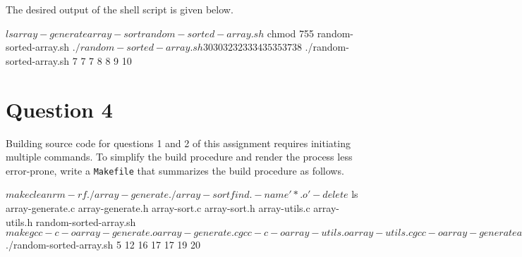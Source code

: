 \documentclass[12pt,letterpaper,twoside]{article}
\begin{document}
The desired output of the shell script is given below.

\begin{terminal}
$ ls
array-generate array-sort random-sorted-array.sh
$ chmod 755 random-sorted-array.sh
$ ./random-sorted-array.sh
30 30 32 32 33 34 35 35 37 38
$ ./random-sorted-array.sh
7 7 7 8 8 9 10
\end{terminal}

\section*{Question 4}

Building source code for questions 1 and 2 of this assignment requires initiating multiple commands.
To simplify the build procedure and render the process less error-prone, write a \texttt{Makefile} that summarizes the build procedure as follows.

\begin{terminal}
$ make clean
rm -rf ./array-generate ./array-sort
find . -name '*.o' -delete
$ ls
array-generate.c array-generate.h array-sort.c array-sort.h
array-utils.c array-utils.h random-sorted-array.sh
$ make
gcc -c -o array-generate.o array-generate.c
gcc -c -o array-utils.o array-utils.c
gcc -o array-generate array-generate.o array-utils.o -Werror -Wall -std=gnu99 -I.
gcc -c -o array-sort.o array-sort.c
gcc -o array-sort array-sort.o array-utils.o -Werror -Wall -std=gnu99 -I.
$ ./random-sorted-array.sh
5 12 16 17 17 19 20
\end{terminal}

\end{document}
